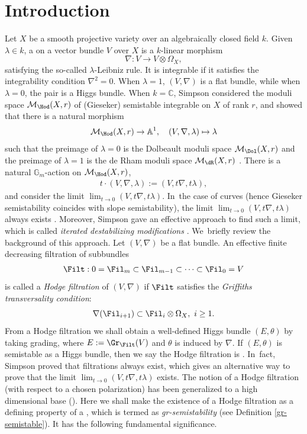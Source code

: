 \section{Introduction}

Let $X$ be a smooth projective variety over an algebraically closed field $k$. Given $\lambda \in k$, a \lconnection on a vector bundle $V$ over $X$ is a $k$-linear morphism
\[
\nabla: V \to V \otimes \Omega_X,
\]
satisfying the so-called $\lambda$-Leibniz rule. It is integrable if it satisfies the integrability condition $\nabla^2=0$. When $\lambda=1$, $(V,\nabla)$ is a flat bundle, while when $\lambda=0$, the pair is a Higgs bundle. When $k=\mathbb{C}$, Simpson considered the moduli space $\mathcal{M}_\Hod(X,r)$ of (Gieseker) semistable integrable \lconnections on $X$ of rank $r$, and showed that there is a natural morphism
\begin{align*}
\mathcal{M}_\Hod(X,r) \to \mathbb{A}^1, \quad (V,\nabla,\lambda) \mapsto \lambda
\end{align*}
such that the preimage of $\lambda=0$ is the Dolbeault moduli space $\mathcal{M}_\Dol(X,r)$ and the preimage of $\lambda=1$ is the de Rham moduli space $\mathcal{M}_\dR(X,r)$ \cite[Prop.\,4.1]{Si97}. There is a natural $\mathbb{G}_m$-action on $\mathcal{M}_\Hod(X,r)$, \ie
\begin{align*}
t \cdot (V,\nabla,\lambda) := (V, t\nabla, t\lambda),
\end{align*}
and consider the limit $\lim_{t \to 0} (V, t\nabla, t\lambda)$. In~the case of curves (hence Gieseker semistability coincides with slope semistability), the limit $\lim_{t \to 0} (V, t\nabla, t\lambda)$ always exists \cite[Lem.\,4.1]{S10}. Moreover, Simpson gave an effective approach to find such a limit, which is called \emph{iterated destabilizing modifications} \cite{S10}. We~briefly review the background of this approach. Let $(V,\nabla)$ be a flat bundle. An effective finite decreasing filtration of subbundles
\begin{align*}
\Filt: 0=\Fil_m \subset \Fil_{m-1} \subset \cdots \subset \Fil_0=V
\end{align*}
is called a \emph{Hodge filtration} of $(V,\nabla)$ if $\Filt$ satisfies the \emph{Griffiths transversality condition}:
\[
\nabla(\Fil_{i+1})\subset \Fil_{i}\otimes \Omega_X, \ i \geq 1.
\]
From a Hodge filtration we shall obtain a well-defined Higgs bundle $(E,\theta)$ by taking grading, where $E: = \Gr_{\Filt}(V)$ and $\theta$ is induced by $\nabla$. If $(E,\theta)$ is semistable as a Higgs bundle, then we say the Hodge filtration is \emph{\grsemistable}. In~fact, Simpson proved that \grsemistable filtrations always exist, which gives an alternative way to prove that the limit $\lim_{t \to 0} (V, t\nabla, t\lambda)$ exists. The notion of a \grsemistable Hodge filtration (with respect to a chosen polarization) has been generalized to a high dimensional base (\cite{LSZ19,L13}). Here we shall make the existence of a \grsemistable Hodge filtration as a defining property of a \lconnection, which is termed as \emph{gr-semistability} (see Definition \ref{gr-semistable}). It has the following fundamental significance.

